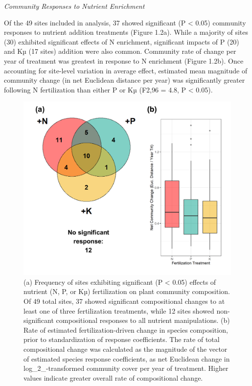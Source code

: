 \documentclass[twoside,12pt,final]{ucthesis-CA2012}
\begin{document}
\begin{ucmainmatter}
\emph{Community Responses to Nutrient Enrichment}

Of the 49 sites included in analysis, 37 showed significant (P \textless{} 0.05) community responses to nutrient addition treatments (Figure 1.2a). While a majority of sites (30) exhibited significant effects of N enrichment, significant impacts of P (20) and Kµ (17 sites) addition were also common. Community rate of change per year of treatment was greatest in response to N enrichment (Figure 1.2b). Once accounting for site-level variation in average effect, estimated mean magnitude of community change (in net Euclidean distance per year) was significantly greater following N fertilization than either P or Kµ (F2,96 = 4.8, P \textless{} 0.05).
\begin{figure}
\centering
\includegraphics[width=\textwidth,height=0.6\textheight]{figure/Fig1_2.png}
\caption{\newline (a) Frequency of sites exhibiting significant (P \textless{} 0.05) effects of nutrient (N, P, or Kµ) fertilization on plant community composition. Of 49 total sites, 37 showed significant compositional changes to at least one of three fertilization treatments, while 12 sites showed non-significant compositional responses to all nutrient manipulations. \newline (b) Rate of estimated fertilization-driven change in species composition, prior to standardization of response coefficients. The rate of total compositional change was calculated as the magnitude of the vector of estimated species response coefficients, as net Euclidean change in log\_2\_-transformed community cover per year of treatment. Higher values indicate greater overall rate of compositional change. \label{fig-1-2}}
\end{figure}
\newline


\end{ucmainmatter}
\end{document}
